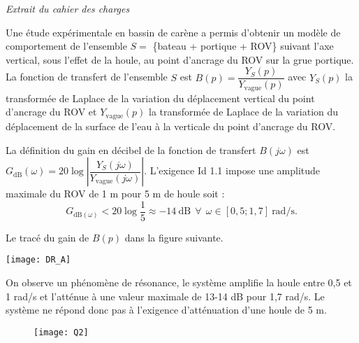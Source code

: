 \begin{multicols}{2}
\begin{center}
\textit{Extrait du cahier des charges}
\label{tab1}
\end{center}

\normalsize


Une étude expérimentale en bassin de carène a permis d’obtenir un modèle de comportement de l’ensemble
$S =$ \{bateau + portique + ROV\} suivant l’axe vertical, sous l’effet de la houle, au point d’ancrage du ROV sur
la grue portique.\\

La fonction de transfert de l’ensemble $S$ est $B(p) =\dfrac{Y_S(p)}{Y_{\text{vague}}(p)}$ avec $Y_S(p)$ la transformée de Laplace de la variation
du déplacement vertical du point d’ancrage du ROV et $Y_{\text{vague}}(p)$ la transformée de Laplace de la variation du déplacement de la surface de l’eau à la verticale du point d’ancrage du ROV.\\

\fi



\ifprof
\begin{corrige}

La définition du gain en décibel de la fonction de transfert $B(j\omega)$ est $G_{\text{dB}}(\omega)=20\log \left \vert \dfrac{Y_S(j\omega)}{Y_{\text{vague}}(j\omega)}\right \vert$. L'exigence Id 1.1 impose une amplitude maximale du ROV de 1 m pour 5 m de houle soit :
$$\boxed{G_{\text{dB}(\omega)}<20 \log \dfrac{1}{5}\approx - 14 \ \text{dB} \ \ \forall \ \ \omega\in[0,5;1,7]  \ \text{rad/s}.}$$
\end{corrige}
\else
\fi

Le tracé du gain de $B(p)$ dans la figure suivante.


\begin{center}
\texttt{[image: DR\_A]}
\end{center}



\ifprof
\begin{corrige}
On observe un phénomène de résonance, le système amplifie la houle entre 0,5 et 1 rad/s et l’atténue à une valeur maximale de 13-14 dB pour 1,7 rad/s. Le syst\`eme ne répond donc pas \`a l’exigence d'atténuation d'une houle de 5 m.
\begin{figure}[H]
\centering
\texttt{[image: Q2]}
\end{figure}



\end{corrige}
\end{multicols}
